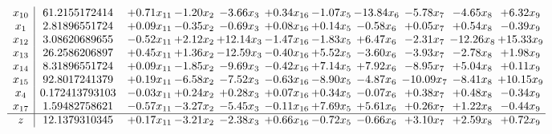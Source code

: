\documentclass[9pt]{article}
\begin{document}
\[\begin{array}{c| c c@{\hskip 2pt} c@{\hskip 2pt} c@{\hskip 2pt} c@{\hskip 2pt} c@{\hskip 2pt} c@{\hskip 2pt} c@{\hskip 2pt} c@{\hskip 2pt} c@{\hskip 2pt} }
 x_{10}   &  61.2155172414 & +  0.71 x_{11} & -1.20 x_{2} & -3.66 x_{3} & +  0.34 x_{16} & -1.07 x_{5} & -13.84 x_{6} & -5.78 x_{7} & -4.65 x_{8} & +  6.32 x_{9}\\
 x_{1}   &  2.81896551724 & +  0.09 x_{11} & -0.35 x_{2} & -0.69 x_{3} & +  0.08 x_{16} & +  0.14 x_{5} & -0.58 x_{6} & +  0.05 x_{7} & +  0.54 x_{8} & -0.39 x_{9}\\
 x_{12}   &  3.08620689655 & -0.52 x_{11} & +  2.12 x_{2} & + 12.14 x_{3} & -1.47 x_{16} & -1.83 x_{5} & +  6.47 x_{6} & -2.31 x_{7} & -12.26 x_{8} & + 15.33 x_{9}\\
 x_{13}   &  26.2586206897 & +  0.45 x_{11} & +  1.36 x_{2} & -12.59 x_{3} & -0.40 x_{16} & +  5.52 x_{5} & -3.60 x_{6} & -3.93 x_{7} & -2.78 x_{8} & +  1.98 x_{9}\\
 x_{14}   &  8.31896551724 & +  0.09 x_{11} & -1.85 x_{2} & -9.69 x_{3} & -0.42 x_{16} & +  7.14 x_{5} & +  7.92 x_{6} & -8.95 x_{7} & +  5.04 x_{8} & +  0.11 x_{9}\\
 x_{15}   &  92.8017241379 & +  0.19 x_{11} & -6.58 x_{2} & -7.52 x_{3} & -0.63 x_{16} & -8.90 x_{5} & -4.87 x_{6} & -10.09 x_{7} & -8.41 x_{8} & + 10.15 x_{9}\\
 x_{4}   &  0.172413793103 & -0.03 x_{11} & +  0.24 x_{2} & +  0.28 x_{3} & +  0.07 x_{16} & +  0.34 x_{5} & -0.07 x_{6} & +  0.38 x_{7} & +  0.48 x_{8} & -0.34 x_{9}\\
 x_{17}   &  1.59482758621 & -0.57 x_{11} & -3.27 x_{2} & -5.45 x_{3} & -0.11 x_{16} & +  7.69 x_{5} & +  5.61 x_{6} & +  0.26 x_{7} & +  1.22 x_{8} & -0.44 x_{9}\\
\hline
z    &  12.1379310345 & +  0.17 x_{11} & -3.21 x_{2} & -2.38 x_{3} & +  0.66 x_{16} & -0.72 x_{5} & -0.66 x_{6} & +  3.10 x_{7} & +  2.59 x_{8} & +  0.72 x_{9}\\
\end{array}\]
\end{document}

